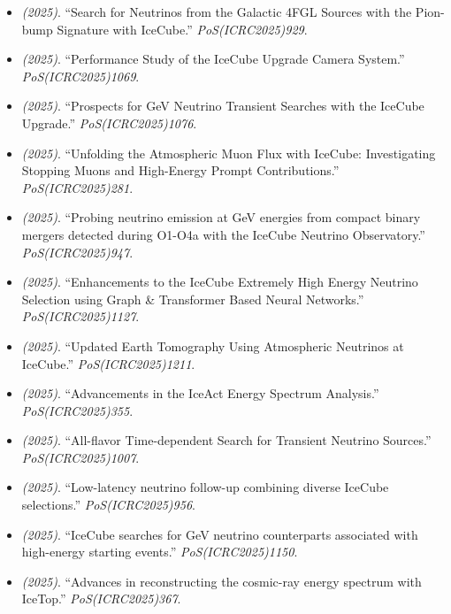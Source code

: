 \begin{itemize}
\item \textit{(2025)}. ``Search for Neutrinos from the Galactic 4FGL Sources with the Pion-bump Signature with IceCube.'' \textit{PoS(ICRC2025)929}.  
\item \textit{(2025)}. ``Performance Study of the IceCube Upgrade Camera System.'' \textit{PoS(ICRC2025)1069}.  
\item \textit{(2025)}. ``Prospects for GeV Neutrino Transient Searches with the IceCube Upgrade.'' \textit{PoS(ICRC2025)1076}.  
\item \textit{(2025)}. ``Unfolding the Atmospheric Muon Flux with IceCube: Investigating Stopping Muons and High-Energy Prompt Contributions.'' \textit{PoS(ICRC2025)281}.  
\item \textit{(2025)}. ``Probing neutrino emission at GeV energies from compact binary mergers detected during O1-O4a with the IceCube Neutrino Observatory.'' \textit{PoS(ICRC2025)947}.  
\item \textit{(2025)}. ``Enhancements to the IceCube Extremely High Energy Neutrino Selection using Graph \& Transformer Based Neural Networks.'' \textit{PoS(ICRC2025)1127}.  
\item \textit{(2025)}. ``Updated Earth Tomography Using Atmospheric Neutrinos at IceCube.'' \textit{PoS(ICRC2025)1211}.  
\item \textit{(2025)}. ``Advancements in the IceAct Energy Spectrum Analysis.'' \textit{PoS(ICRC2025)355}.  
\item \textit{(2025)}. ``All-flavor Time-dependent Search for Transient Neutrino Sources.'' \textit{PoS(ICRC2025)1007}.  
\item \textit{(2025)}. ``Low-latency neutrino follow-up combining diverse IceCube selections.'' \textit{PoS(ICRC2025)956}.  
\item \textit{(2025)}. ``IceCube searches for GeV neutrino counterparts associated with high-energy starting events.'' \textit{PoS(ICRC2025)1150}.  
\item \textit{(2025)}. ``Advances in reconstructing the cosmic-ray energy spectrum with IceTop.'' \textit{PoS(ICRC2025)367}.  

\end{itemize}
